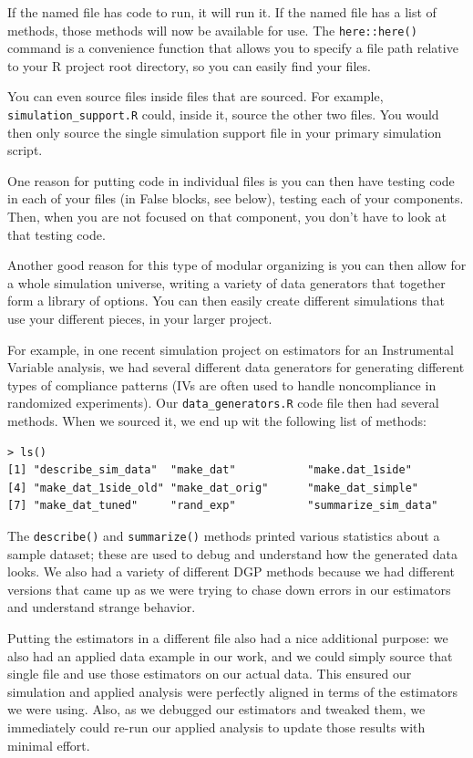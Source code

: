 \documentclass[
]{book}
\begin{document}
If the named file has code to run, it will run it.
If the named file has a list of methods, those methods will now be available for use.
The \texttt{here::here()} command is a convenience function that allows you to specify a file path relative to your R project root directory, so you can easily find your files.

You can even source files inside files that are sourced.
For example, \texttt{simulation\_support.R} could, inside it, source the other two files.
You would then only source the single simulation support file in your primary simulation script.

One reason for putting code in individual files is you can then have testing code in each of your files (in False blocks, see below), testing each of your components.
Then, when you are not focused on that component, you don't have to look at that testing code.

Another good reason for this type of modular organizing is you can then allow for a whole simulation universe, writing a variety of data generators that together form a library of options.
You can then easily create different simulations that use your different pieces, in your larger project.

For example, in one recent simulation project on estimators for an Instrumental Variable analysis, we had several different data generators for generating different types of compliance patterns (IVs are often used to handle noncompliance in randomized experiments).
Our \texttt{data\_generators.R} code file then had several methods.
When we sourced it, we end up wit the following list of methods:

\begin{verbatim}
> ls()
[1] "describe_sim_data"  "make_dat"           "make.dat_1side"     
[4] "make_dat_1side_old" "make_dat_orig"      "make_dat_simple"
[7] "make_dat_tuned"     "rand_exp"           "summarize_sim_data"
\end{verbatim}

The \texttt{describe()} and \texttt{summarize()} methods printed various statistics about a sample dataset; these are used to debug and understand how the generated data looks.
We also had a variety of different DGP methods because we had different versions that came up as we were trying to chase down errors in our estimators and understand strange behavior.

Putting the estimators in a different file also had a nice additional purpose: we also had an applied data example in our work, and we could simply source that single file and use those estimators on our actual data.
This ensured our simulation and applied analysis were perfectly aligned in terms of the estimators we were using.
Also, as we debugged our estimators and tweaked them, we immediately could re-run our applied analysis to update those results with minimal effort.
\end{document}
